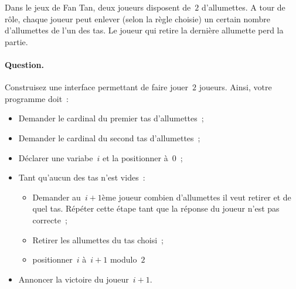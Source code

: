 Dans le jeux de Fan Tan, deux joueurs disposent de~$2$ d'allumettes. A
tour de r\^ole, chaque joueur peut enlever (selon la r\`egle choisie)
un certain nombre d'allumettes de l'un des tas. Le joueur qui retire
la derni\`ere allumette perd la partie.
\paragraph{Question.}
Construisez une interface permettant de faire jouer~$2$ joueurs.
Ainsi, votre programme doit~:
\begin{itemize}
\item Demander le cardinal du premier tas d'allumettes~;
\item Demander le cardinal du second tas d'allumettes~;
\item D\'eclarer une variabe~$i$ et la positionner \`a~$0$~;
\item Tant qu'aucun des tas n'est vides~:
  \begin{itemize}
  \item Demander au~${i+1}$\`eme joueur combien d'allumettes il veut
    retirer et de quel tas. R\'ep\'eter cette \'etape tant que la
    r\'eponse du joueur n'est pas correcte~;
  \item Retirer les allumettes du tas choisi~;
  \item positionner~$i$ \`a~${i+1}$ modulo~$2$
  \end{itemize}
\item Annoncer la victoire du joueur~${i+1}$.
\end{itemize}
